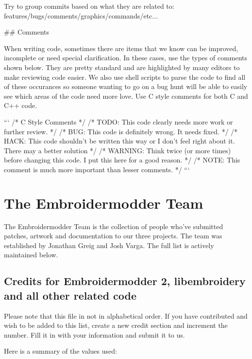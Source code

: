 Try to group commits based on what they are related to: features/bugs/comments/graphics/commands/etc...

## Comments

When writing code, sometimes there are items that we know can be improved,
incomplete or need special clarification. In these cases, use the types of
comments shown below. They are pretty standard and are highlighted by many editors to
make reviewing code easier. We also use shell scripts to parse the code to find
all of these occurances so someone wanting to go on a bug hunt will be able to
easily see which areas of the code need more love. Use C style comments for
both C and C++ code.

```
/* C Style Comments */
/* TODO: This code clearly needs more work or further review. */
/* BUG: This code is definitely wrong. It needs fixed. */
/* HACK: This code shouldn't be written this way or I don't feel right about it. There may a better solution */
/* WARNING: Think twice (or more times) before changing this code. I put this here for a good reason. */
/* NOTE: This comment is much more important than lesser comments. */
```
\section{The Embroidermodder Team}

The Embroidermodder Team is the collection of people who've submitted
patches, artwork and documentation to our three projects.
The team was established by Jonathan Greig and Josh Varga.
The full list is actively maintained below.

\subsection{Credits for Embroidermodder 2, libembroidery and all other related code}
\label{credits-for-embroidermodder-2-libembroidery-and-all-other-related-code}

Please note that this file in not in alphabetical order. If you have contributed and wish to be added to this list, create a new credit section and increment the number. Fill it in with your information and submit it to us.

Here is a summary of the values used:

